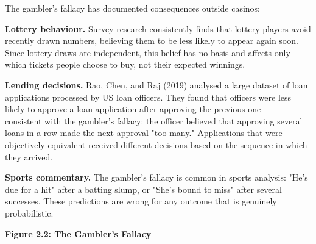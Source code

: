 \documentclass[12pt, letterpaper]{article}
\begin{document}
The gambler's fallacy has documented consequences outside casinos:

\textbf{Lottery behaviour.} Survey research consistently finds that lottery players avoid recently drawn numbers, believing them to be less likely to appear again soon. Since lottery draws are independent, this belief has no basis and affects only which tickets people choose to buy, not their expected winnings.

\textbf{Lending decisions.} Rao, Chen, and Raj (2019) analysed a large dataset of loan applications processed by US loan officers. They found that officers were less likely to approve a loan application after approving the previous one --- consistent with the gambler's fallacy: the officer believed that approving several loans in a row made the next approval "too many." Applications that were objectively equivalent received different decisions based on the sequence in which they arrived.

\textbf{Sports commentary.} The gambler's fallacy is common in sports analysis: "He's due for a hit" after a batting slump, or "She's bound to miss" after several successes. These predictions are wrong for any outcome that is genuinely probabilistic.

\textbf{Figure 2.2: The Gambler's Fallacy}

\end{document}
